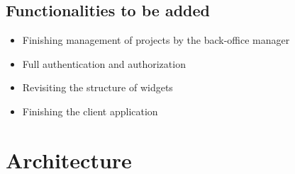 \documentclass[a4paper,twoside,10pt]{report}
\begin{document}
\section{Functionalities to be added}
\begin{itemize}
    \item Finishing management of projects by the back-office manager
    \item Full authentication and authorization
    \item Revisiting the structure of widgets
    \item Finishing the client application
\end{itemize}

\chapter{Architecture}
\end{document}
